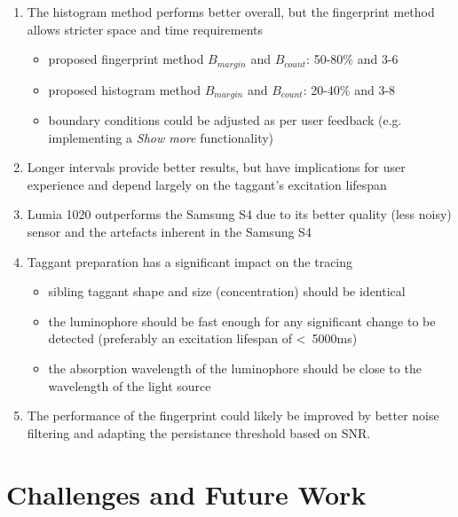 \documentclass[thesis.tex]{subfiles}
\begin{document}
\begin{enumerate}
  \item The histogram method performs better overall, but the fingerprint method allows stricter space and time requirements
    \begin{itemize}
      \item proposed fingerprint method $B_{margin}$ and $B_{count}$: 50-80\% and 3-6
      \item proposed histogram method $B_{margin}$ and $B_{count}$: 20-40\% and 3-8
      \item boundary conditions could be adjusted as per user feedback (e.g. implementing a \emph{Show more} functionality)
    \end{itemize}
  \item Longer intervals provide better results, but have implications for user experience and depend largely on the taggant's excitation lifespan
  \item Lumia 1020 outperforms the Samsung S4 due to its better quality (less noisy) sensor and the artefacts inherent in the Samsung S4
  \item Taggant preparation has a significant impact on the tracing
    \begin{itemize}
      \item sibling taggant shape and size (concentration) should be identical
      \item the luminophore should be fast enough for any significant change to be detected (preferably an excitation lifespan of \textless\ 5000ms)
      \item the absorption wavelength of the luminophore should be close to the wavelength of the light source
    \end{itemize}
  \item The performance of the fingerprint could likely be improved by better noise filtering and adapting the persistance threshold based on SNR.
\end{enumerate}


\section{Challenges and Future Work}
\end{document}
